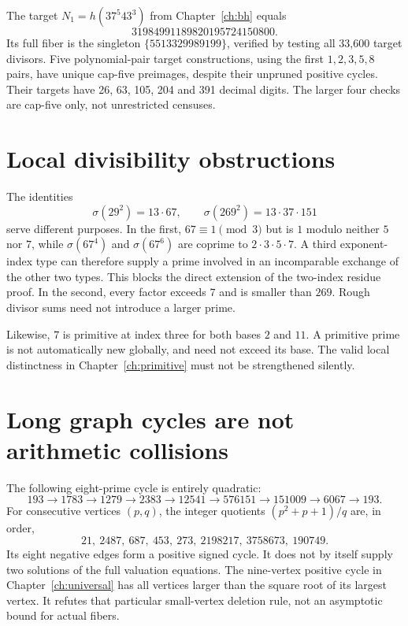 The target $N_1=h(37^5 43^3)$ from Chapter~\ref{ch:bh} equals
\[
 31984991189820195724150800.
\]
Its full fiber is the singleton $\{5513329989199\}$, verified by testing all
33,600 target divisors. Five polynomial-pair target constructions, using the
first $1,2,3,5,8$ pairs, have unique cap-five preimages, despite their unpruned
positive cycles. Their targets have 26, 63, 105, 204 and 391 decimal digits.
The larger four checks are cap-five only, not unrestricted censuses.

\section{Local divisibility obstructions}
The identities
\[
 \sigma(29^2)=13\cdot67,
 \qquad \sigma(269^2)=13\cdot37\cdot151
\]
serve different purposes. In the first, $67\equiv1\pmod3$ but is $1$ modulo
neither $5$ nor $7$, while $\sigma(67^4)$ and $\sigma(67^6)$ are coprime to
$2\cdot3\cdot5\cdot7$. A third exponent-index type can therefore supply a
prime involved in an incomparable exchange of the other two types. This
blocks the direct extension of the two-index residue proof.
In the second, every factor exceeds $7$ and is smaller than $269$.
Rough divisor sums need not introduce a larger prime.

Likewise, $7$ is primitive at index three for both bases $2$ and $11$.
A primitive prime is not automatically new globally, and need not exceed its
base. The valid local distinctness in Chapter~\ref{ch:primitive} must not be
strengthened silently.

\section{Long graph cycles are not arithmetic collisions}
The following eight-prime cycle is entirely quadratic:
\[
 193\to1783\to1279\to2383\to12541\to576151\to151009\to6067\to193.
\]
For consecutive vertices $(p,q)$, the integer quotients
$(p^2+p+1)/q$ are, in order,
\[
 21,\ 2487,\ 687,\ 453,\ 273,\ 2198217,\ 3758673,\ 190749.
\]
Its eight negative edges form a positive signed cycle. It does not by itself
supply two solutions of the full valuation equations.
The nine-vertex positive cycle in Chapter~\ref{ch:universal} has all vertices
larger than the square root of its largest vertex. It refutes that particular
small-vertex deletion rule, not an asymptotic bound for actual fibers.

